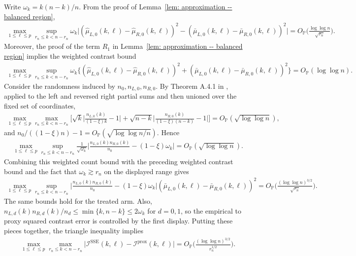 \documentclass[10pt]{article}
\def\P{\mathbb{P}}
\def\I{\mathscr{I}}
\theoremstyle{definition}
\theoremstyle{remark}
\begin{document}
Write $\omega_k=k(n-k)/n$. From the proof of Lemma~\ref{lem: approximation -- balanced region},
\begin{align*} 
    \max_{1\leq \ell\leq p}\sup_{r_n \leq k < n - r_n} \omega_k \bigg|(\hat \mu_{L,0}(k,\ell) - \hat \mu_{R,0}(k,\ell))^2 - (\bar \mu_{L,0}(k,\ell) - \bar \mu_{R,0}(k,\ell))^2\bigg| = O_\P \bigg(\frac{\log \log n}{\sqrt{r_n}}\bigg).
\end{align*}
Moreover, the proof of the term $R_1$ in Lemma~\ref{lem: approximation -- balanced region} implies the weighted contrast bound
\begin{align*}
    \max_{1\leq \ell\leq p}\sup_{r_n \leq k < n - r_n} \omega_k \bigg\{(\hat \mu_{L,0}(k,\ell) - \hat \mu_{R,0}(k,\ell))^2 + (\bar \mu_{L,0}(k,\ell) - \bar \mu_{R,0}(k,\ell))^2\bigg\} = O_\P(\log \log n).
\end{align*}
Consider the randomness induced by $n_0, n_{L,0}, n_{R,0}$. By Theorem A.4.1 in \cite{csorgo1997limit}, applied to the left and reversed right partial sums and then unioned over the fixed set of coordinates,
\begin{align*}
    \max_{1\leq \ell\leq p}\max_{r_n \leq k < n - r_n}
    \bigg[
    \sqrt{k}\bigg|\frac{n_{L,0}(k)}{(1-\xi)k}-1\bigg|
    +\sqrt{n-k}\bigg|\frac{n_{R,0}(k)}{(1-\xi)(n-k)}-1\bigg|
    \bigg]
     = O_{\P} (\sqrt{\log \log n}),
\end{align*}
and $n_0/((1-\xi)n)-1=O_\P(\sqrt{\log\log n/n})$. Hence
\begin{align*}
    \max_{1\leq \ell\leq p}\sup_{r_n \leq k < n - r_n}
    \frac{1}{\sqrt{\omega_k}}
    \bigg|\frac{n_{L,0}(k) n_{R,0}(k)}{n_0} - (1 - \xi)\omega_k\bigg|
    = O_\P(\sqrt{\log \log n}).
\end{align*}
Combining this weighted count bound with the preceding weighted contrast bound and the fact that $\omega_k\gtrsim r_n$ on the displayed range gives
\begin{align*}
    \max_{1\leq \ell\leq p}\sup_{r_n \leq k < n - r_n}
    \bigg|\frac{n_{L,0}(k)n_{R,0}(k)}{n_0}-(1-\xi)\omega_k\bigg|
    (\bar \mu_{L,0}(k,\ell)-\bar\mu_{R,0}(k,\ell))^2
    =O_\P\bigg(\frac{(\log\log n)^{3/2}}{\sqrt{r_n}}\bigg).
\end{align*}
The same bounds hold for the treated arm. Also,
$n_{L,d}(k)n_{R,d}(k)/n_d\leq \min\{k,n-k\}\leq 2\omega_k$ for $d=0,1$, so the empirical to proxy squared contrast error is controlled by the first display. Putting these pieces together, the triangle inequality implies
\begin{align*}  
    \max_{1 \leq \ell \leq p}\max_{r_n \leq k < n - r_n} \Big|\I^{\text{SSE}}(k,\ell) - \I^{\text{prox}}(k,\ell)\Big| = O_{\P} \bigg(\frac{(\log \log n)^{3/2}}{r_n^{1/2}}\bigg).
\end{align*}
\end{document}
